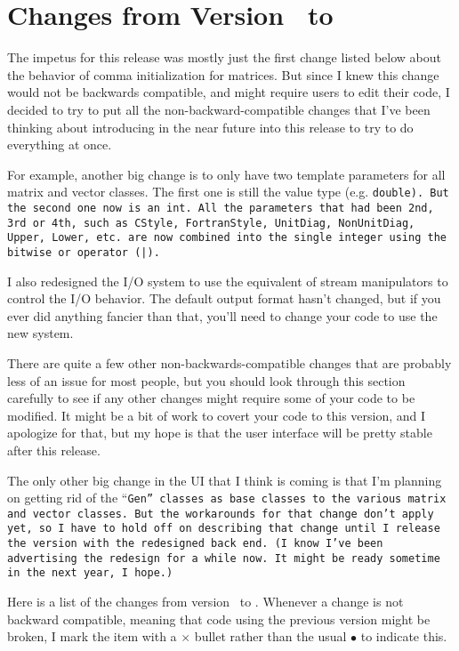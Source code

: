 
\section{Changes from Version \prevtmvversion\ to \tmvversion}
\label{Changes}

The impetus for this release was mostly just the first change listed below
about the behavior of comma initialization for matrices.  But since I knew
this change would not be backwards compatible, and might require users
to edit their code, I decided to try to put all the non-backward-compatible changes that I've been thinking about introducing in the near future into this
release to try to do everything at once. 

For example, another big change is to only have two template parameters for all matrix and vector
classes.  The first one is
still the value type (e.g. \tt{double}).  But the second one now is an \tt{int}.
All the parameters that had been 2nd, 3rd or 4th, such as \tt{CStyle}, \tt{FortranStyle}, 
\tt{UnitDiag}, \tt{NonUnitDiag}, \tt{Upper}, \tt{Lower}, etc. are now combined into the single
integer using the bitwise or operator (\tt{|}).  

I also redesigned the I/O system to use the equivalent of stream manipulators 
to control the I/O behavior.  The default output format hasn't changed, but 
if you ever did anything fancier than that, you'll need to change your code 
to use the new system.

There are quite a few other non-backwards-compatible changes that are 
probably less of an issue for most people, but you should look through 
this section carefully to see if any other changes might require some
of your code to be modified.  It might be a bit of work to covert your 
code to this version, and I apologize for that, but my hope is that the 
user interface will be pretty stable after this release.

The only other big change in the UI that I think is coming is that I'm 
planning on getting rid of the ``\tt{Gen}'' classes as base classes to
the various matrix and vector classes.  But the workarounds for that 
change don't apply yet, so I have to hold off on describing that change
until I release the version with the redesigned back end.
(I know I've been advertising the redesign for a while now.
It might be ready sometime in the next year, I hope.)

Here is a list of the changes from version \prevtmvversion\ to \tmvversion.  
Whenever a change is not backward compatible, meaning that code using the previous version might be broken, I mark the item with a $\times$ bullet rather than the usual $\bullet$ to indicate this.  

